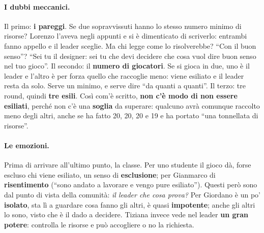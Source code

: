 \paragraph{I dubbi meccanici.} Il primo: \textbf{i pareggi}. Se due sopravvissuti
hanno lo stesso numero minimo di risorse? Lorenzo l'aveva negli appunti e si è
dimenticato di scriverlo: entrambi fanno appello e il leader sceglie. Ma chi legge
come lo risolverebbe? ``Con il buon senso''? ``Sei tu il designer: sei tu che devi
decidere che cosa vuol dire buon senso nel tuo gioco''. Il secondo: il \textbf{numero
di giocatori}. Se si gioca in due, uno è il leader e l'altro è per forza quello che
raccoglie meno: viene esiliato e il leader resta da solo. Serve un minimo, e serve
dire ``da quanti a quanti''. Il terzo: tre round, quindi \textbf{tre esili}. Così
com'è scritto, \textbf{non c'è modo di non essere esiliati}, perché non c'è una
\textbf{soglia} da superare: qualcuno avrà comunque raccolto meno degli altri, anche
se ha fatto 20, 20, 20 e 19 e ha portato ``una tonnellata di risorse''.

\paragraph{Le emozioni.} Prima di arrivare all'ultimo punto, la classe. Per uno
studente il gioco dà, forse escluso chi viene esiliato, un senso di
\textbf{esclusione}; per Gianmarco di \textbf{risentimento} (``sono andato a
lavorare e vengo pure esiliato''). Questi però sono dal punto di vista della comunità:
\emph{il leader che cosa prova?} Per Giordano è un po' \textbf{isolato}, sta lì a
guardare cosa fanno gli altri, è quasi \textbf{impotente}; anche gli altri lo sono,
visto che è il dado a decidere. Tiziana invece vede nel leader \textbf{un gran
potere}: controlla le risorse e può accogliere o no la richiesta.

